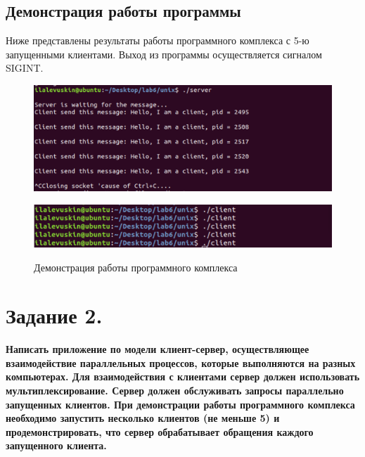 \documentclass[a4paper,12pt]{article}
\begin{document}
	\subsection*{Демонстрация работы программы}
	
	Ниже представлены результаты работы программного комплекса с 5-ю запущенными клиентами. Выход из программы осуществляется сигналом SIGINT.
	
	\begin{figure}[h!]
		\begin{center}
			{\includegraphics[scale = 0.7]{test_server_1.png}}
			\label{ris:test_server_1}
		\end{center}
	\end{figure}

	\begin{figure}[h!]
		\begin{center}
			{\includegraphics[scale = 0.7]{test_client_1.png}}
			\label{ris:test_client_1}
		\end{center}
		\caption{Демонстрация работы программного комплекса}
	\end{figure}
	
	\newpage
	
	\section*{Задание 2.}
	
	{\bf Написать приложение по модели клиент-сервер, осуществляющее взаимодействие параллельных процессов, которые выполняются на разных компьютерах. Для взаимодействия с клиентами сервер должен использовать мультиплексирование. Сервер должен обслуживать запросы параллельно запущенных клиентов. При демонстрации работы программного комплекса необходимо запустить несколько клиентов (не меньше 5) и продемонстрировать, что сервер обрабатывает обращения каждого запущенного клиента.}
	
\end{document}

